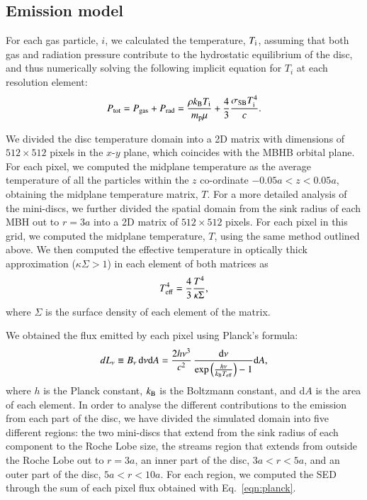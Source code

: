 \documentclass{aa}
\begin{document}

\subsection{Emission model}
\label{Emission model}

For each gas particle, $i$, we calculated the temperature, $T_{\rm i }$, assuming that both gas and radiation pressure contribute to the hydrostatic equilibrium of the disc, and thus numerically solving the following implicit  equation for $T_i$ at each resolution element:
\begin{equation}
    \label{eqn:Ptot}
    P_{\rm tot} = P_{\rm gas} + P_{\rm rad} = \frac{\rho k_{\rm B} T_{\rm i}}{m_{\rm p}\mu} + \frac{4}{3}\frac{\sigma_{\rm SB} T_{\rm i}^4}{c}.
\end{equation}

We divided the disc temperature domain into a 2D matrix with dimensions of $512 \times 512$ pixels in the $x$-$y$ plane, which coincides with the MBHB orbital plane. For each pixel, we computed the midplane temperature as the average temperature of all the particles within the $z$ co-ordinate $-0.05 a < z < 0.05 a $, obtaining the midplane temperature matrix, $T$. For a more detailed analysis of the mini-discs, we further divided the spatial domain from the sink radius of each MBH out to $r = 3 a$ into a 2D matrix of $512 \times 512$ pixels. For each pixel in this grid, we computed the midplane temperature, $T$, using the same method outlined above. 
We then computed the effective temperature in optically thick approximation ($\kappa\Sigma > 1 $) in each element of both matrices as 
\begin{equation}
    \label{eqn:Teff}
    T_{\rm eff}^4 = \frac{4}{3}\frac{T^4}{\kappa \Sigma}
,\end{equation}
where $\Sigma$ is the surface density of each element of the matrix.

We obtained the flux emitted by each pixel using Planck's formula:
\begin{equation}
    \label{eqn:planck}
    dL_{\nu} \equiv B_{\nu }  \, {\rm d}\nu {\rm d}A  = \frac {2h \nu^3}{c^2}\, \frac{{\rm d}\nu}{  \exp\left({\frac{h\nu}{k_{\rm B}T_{\rm eff}}}\right) -1 } {\rm d}A 
,\end{equation}
where $h$ is the Planck constant, $k_{\rm B}$ is the Boltzmann constant, and d$A$ is the area of each element.
In order to analyse the different contributions to the emission from each part of the disc, we have divided the simulated domain into five different regions: the two mini-discs that extend from the sink radius of each component to the Roche Lobe size, the streams region that extends from outside the Roche Lobe out to $r = 3a$, an inner part of the disc, $3a < r < 5a $, and an outer part of the disc,  $5a < r < 10a $. 
For each region, we computed the SED through the sum of each pixel flux obtained with Eq.~\eqref{eqn:planck}. 
\end{document}
